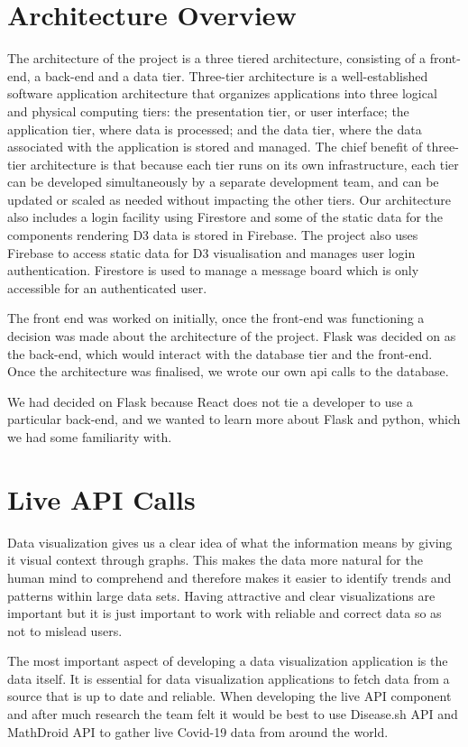 \section{Architecture Overview}
The architecture of the project is a three tiered architecture, consisting of a front-end, a back-end and a data tier.
Three-tier architecture is a well-established software application architecture that organizes applications into three logical and physical computing tiers: the presentation tier, or user interface; the application tier, where data is processed; and the data tier, where the data associated with the application is stored and managed.
The chief benefit of three-tier architecture is that because each tier runs on its own infrastructure, each tier can be developed simultaneously by a separate development team, and can be updated or scaled as needed without impacting the other tiers.\cite{architecture}
Our architecture also includes a login facility using Firestore and some of the static data for the components rendering D3 data is stored in Firebase.
The project also uses Firebase to access static data for D3 visualisation and manages user login authentication. Firestore is used to manage a message board which is only accessible for an authenticated user.


The front end was worked on initially, once the front-end was functioning a decision was made about the architecture of the project. Flask was decided on as the back-end, which would interact with the database tier and the front-end.
Once the architecture was finalised, we wrote our own api calls to the database.
 
We had decided on Flask because React does not tie a developer to use a particular back-end, and we wanted to learn more about Flask and python, which we had some familiarity with.

\section{Live API Calls}
Data visualization gives us a clear idea of what the information means by giving it visual context through graphs. This makes the data more natural for the human mind to comprehend and therefore makes it easier to identify trends and patterns within large data sets. Having attractive and clear visualizations are important but it is just important to work with reliable and correct data so as not to mislead users.

The most important aspect of developing a data visualization application is the data itself. It is essential for data visualization applications to fetch data from a source that is up to date and reliable. When developing the live API component and after much research the team felt it would be best to use Disease.sh API and MathDroid API to gather live Covid-19 data from around the world.

